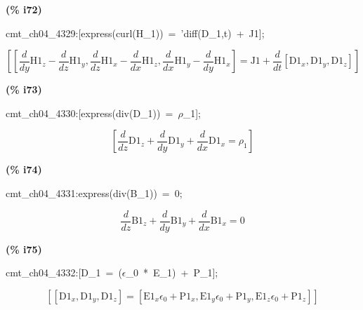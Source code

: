 \documentclass[fleqn]{article}
\begin{document}
\noindent
\begin{minipage}[t]{4.000000em}\color{red}\bfseries
(\% i72)	
\end{minipage}
\begin{minipage}[t]{\textwidth}\color{blue}
cmt\_ch04\_4329:[express(curl(H\_1))\ =\ 'diff(D\_1,t)\ +\ J1];
\end{minipage}
\[\displaystyle \tag{\% o72} 
\left[ \left[ \frac{d}{d y} {{\ensuremath{\mathrm{H1}}}_z}-\frac{d}{d z} {{\ensuremath{\mathrm{H1}}}_y}\operatorname{,}\frac{d}{d z} {{\ensuremath{\mathrm{H1}}}_x}-\frac{d}{d x} {{\ensuremath{\mathrm{H1}}}_z}\operatorname{,}\frac{d}{d x} {{\ensuremath{\mathrm{H1}}}_y}-\frac{d}{d y} {{\ensuremath{\mathrm{H1}}}_x}\right] =\ensuremath{\mathrm{J1}}+\frac{d}{d t} \left[ {{\ensuremath{\mathrm{D1}}}_x}\operatorname{,}{{\ensuremath{\mathrm{D1}}}_y}\operatorname{,}{{\ensuremath{\mathrm{D1}}}_z}\right] \right] \mbox{}
\]


\noindent
\begin{minipage}[t]{4.000000em}\color{red}\bfseries
(\% i73)	
\end{minipage}
\begin{minipage}[t]{\textwidth}\color{blue}
cmt\_ch04\_4330:[express(div(D\_1))\ =\ \ensuremath{\rho}\_1];
\end{minipage}
\[\displaystyle \tag{\% o73} 
\left[ \frac{d}{d z} {{\ensuremath{\mathrm{D1}}}_z}+\frac{d}{d y} {{\ensuremath{\mathrm{D1}}}_y}+\frac{d}{d x} {{\ensuremath{\mathrm{D1}}}_x}={{\rho }_1}\right] \mbox{}
\]


\noindent
\begin{minipage}[t]{4.000000em}\color{red}\bfseries
(\% i74)	
\end{minipage}
\begin{minipage}[t]{\textwidth}\color{blue}
cmt\_ch04\_4331:express(div(B\_1))\ =\ 0;
\end{minipage}
\[\displaystyle \tag{\% o74} 
\frac{d}{d z} {{\ensuremath{\mathrm{B1}}}_z}+\frac{d}{d y} {{\ensuremath{\mathrm{B1}}}_y}+\frac{d}{d x} {{\ensuremath{\mathrm{B1}}}_x}=0\mbox{}
\]


\noindent
\begin{minipage}[t]{4.000000em}\color{red}\bfseries
(\% i75)	
\end{minipage}
\begin{minipage}[t]{\textwidth}\color{blue}
cmt\_ch04\_4332:[D\_1\ =\ (\ensuremath{\epsilon}\_0\ *\ E\_1)\ +\ P\_1];
\end{minipage}
\[\displaystyle \tag{\% o75} 
\left[ \left[ {{\ensuremath{\mathrm{D1}}}_x}\operatorname{,}{{\ensuremath{\mathrm{D1}}}_y}\operatorname{,}{{\ensuremath{\mathrm{D1}}}_z}\right] =\left[ {{\ensuremath{\mathrm{E1}}}_x} {{\epsilon }_0}+{{\ensuremath{\mathrm{P1}}}_x}\operatorname{,}{{\ensuremath{\mathrm{E1}}}_y} {{\epsilon }_0}+{{\ensuremath{\mathrm{P1}}}_y}\operatorname{,}{{\ensuremath{\mathrm{E1}}}_z} {{\epsilon }_0}+{{\ensuremath{\mathrm{P1}}}_z}\right] \right] \mbox{}
\]
\end{document}
